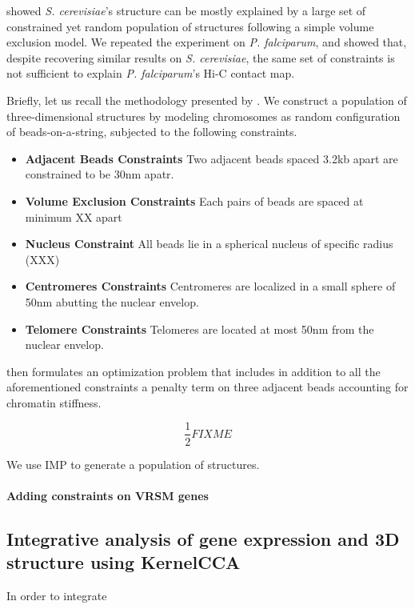 \documentclass[oupdraft]{bio}
\begin{document}
\citet{tjong:physical} showed \textit{S. cerevisiae}'s structure can be mostly
explained by a large set of constrained yet random population of structures
following a simple volume exclusion model. We repeated the experiment on {\em
P. falciparum}, and showed that, despite recovering similar results on {\em S.
cerevisiae}, the same set of constraints is not sufficient to explain {\em P.
falciparum}'s Hi-C contact map. 

Briefly, let us recall the methodology presented by \citet{tjong:physical}. We
construct a population of three-dimensional structures by modeling chromosomes
as random configuration of beads-on-a-string, subjected to the following constraints.

\begin{itemize}
\item \textbf{Adjacent Beads Constraints} Two adjacent beads spaced 3.2kb apart are constrained to be 30nm apatr.
\item \textbf{Volume Exclusion Constraints} Each pairs of beads are spaced at minimum XX apart
\item \textbf{Nucleus Constraint} All beads lie in a spherical nucleus of specific
radius (XXX)
\item \textbf{Centromeres Constraints} Centromeres are localized in a small sphere of
50nm abutting the nuclear envelop.
\item \textbf{Telomere Constraints} Telomeres are located at most 50nm from the nuclear envelop.
\end{itemize}

\citet{tjong:physical} then formulates an optimization problem that includes
in addition to all the aforementioned constraints a penalty term on three
adjacent beads accounting for chromatin stiffness.

$$
\frac{1}{2} FIXME
$$

We use IMP to generate a population of structures.

\paragraph{Adding constraints on VRSM genes}

\subsection{Integrative analysis of gene expression and 3D structure using KernelCCA}

In order to integrate
\end{document}
